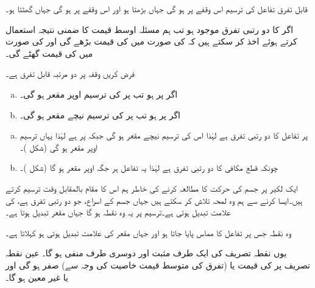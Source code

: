 قابل تفرق تفاعل  کی ترسیم اس وقفے  پر  ہو گی جہاں  بڑھتا ہو اور اس وقفے  پر   ہو گی جہاں  گھٹتا ہو۔

اگر  کا دو رتبی تفرق موجود ہو تب ہم مسئلہ اوسط قیمت کا ضمنی نتیجہ  استعمال کرتے ہوئے اخذ کر سکتے ہیں کہ  کی صورت میں  کی قیمت بڑھے گی اور  کی صورت میں  کی قیمت گھٹے گی۔ 


فرض کریں وقفہ  پر  دو مرتبہ قابل تفرق ہے۔
\begin{enumerate}[a.]
\item
اگر  پر  ہو تب  پر  کی ترسیم اوپر مقعر ہو گی۔
\item
اگر  پر  ہو تب  پر  کی ترسیم نیچے مقعر ہو گی۔
\end{enumerate}

\begin{enumerate}[a.]
\item
{} پر تفاعل  کا دو رتبی تفرق  ہے  لہٰذا اس کی ترسیم نیچے مقعر ہو گی جبکہ  پر  ہے لہٰذا یہاں ترسیم اوپر مقعر ہو گی (شکل )۔
\item
چونکہ قطع مکافی  کا دو رتبی تفرق  ہے لہٰذا یہ تفاعل  ہر جگہ اوپر مقعر ہو گا (شکل )۔ 
\end{enumerate}
ایک لکیر پر جسم کی حرکت کا مطالعہ کرنے کی خاطر ہم اس کا مقام بالمقابل وقت ترسیم کرتے ہیں۔ایسا کرنے سے ہم وہ لمحہ تلاش کر سکتے  ہیں جہاں جسم کے اسراع، جو دو رتبی تفرق ہے، کی علامت تبدیل ہوتی ہے۔ترسیم پر یہ وہ نقطہ ہو گا جہاں مقعر تبدیل ہوتا ہے۔

وہ نقطہ جس پر  تفاعل کا مماس پایا جاتا ہو اور جہاں مقعر کی علامت تبدیل ہوتی ہو  کہلاتا ہے۔

یوں نقطہ تصریف کی ایک طرف  مثبت اور دوسری طرف منفی ہو گا۔ عین نقطہ تصریف پر  کی قیمت یا (تفرق کی متوسط قیمت خاصیت کی وجہ سے) صفر ہو گی  اور یا  غیر معین ہو گا۔


